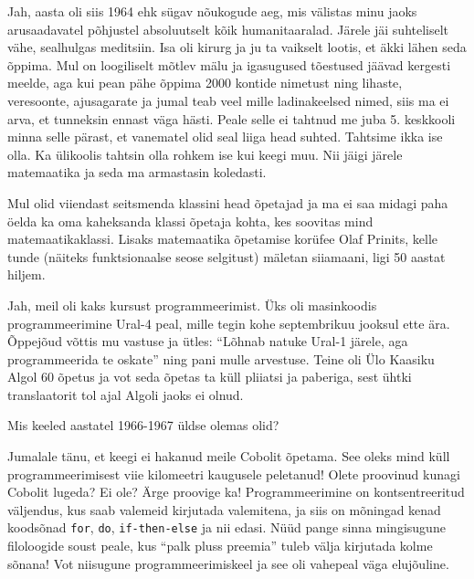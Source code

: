 
Jah, aasta oli siis 1964 ehk sügav nõukogude aeg, mis välistas minu jaoks arusaadavatel 
põhjustel absoluutselt kõik humanitaaralad. Järele jäi suhteliselt vähe, sealhulgas meditsiin. Isa oli kirurg ja ju ta 
vaikselt lootis, et äkki lähen seda õppima. Mul on loogiliselt mõtlev mälu ja 
igasugused tõestused jäävad kergesti meelde, aga kui pean 
pähe õppima 2000 kontide nimetust ning lihaste, veresoonte, 
ajusagarate ja jumal teab veel mille ladinakeelsed nimed, siis ma ei 
arva, et tunneksin ennast väga hästi. Peale selle ei tahtnud me juba 5. keskkooli 
minna selle pärast, et vanematel olid seal liiga head suhted. 
Tahtsime ikka ise olla. Ka ülikoolis tahtsin olla rohkem ise kui keegi muu. 
Nii jäigi järele matemaatika ja seda ma armastasin koledasti. 

Mul olid viiendast seitsmenda klassini head õpetajad ja ma ei saa midagi 
paha öelda ka oma kaheksanda klassi õpetaja kohta, kes soovitas mind matemaatikaklassi. Lisaks matemaatika õpetamise korüfee Olaf 
Prinits, kelle tunde (näiteks funktsionaalse seose selgitust) mäletan siiamaani, ligi 50 aastat hiljem. 


Jah, meil oli kaks kursust programmeerimist. Üks oli masinkoodis 
programmeerimine Ural-4 peal, mille tegin 
kohe septembrikuu jooksul ette ära. Õppejõud võttis mu 
vastuse ja ütles: \enquote{Lõhnab natuke Ural-1 järele, aga programmeerida te 
oskate} ning pani mulle arvestuse. Teine oli Ülo Kaasiku Algol 60 õpetus ja vot seda õpetas ta küll pliiatsi ja 
paberiga, sest ühtki translaatorit tol ajal Algoli jaoks ei olnud. 


Mis keeled aastatel 1966-1967 üldse olemas olid? 

Jumalale tänu, et keegi ei hakanud meile Cobolit õpetama. See 
oleks mind küll programmeerimisest viie kilomeetri kaugusele peletanud! Olete 
proovinud kunagi Cobolit lugeda? Ei ole? Ärge proovige ka! Programmeerimine 
on kontsentreeritud väljendus, kus saab valemeid kirjutada valemitena, ja 
siis on mõningad kenad koodsõnad \verb|for|, \verb|do|, 
\verb|if-then-else| ja nii edasi. Nüüd pange sinna mingisugune filoloogide 
soust peale, kus \enquote{palk pluss preemia} tuleb välja kirjutada kolme 
sõnana! Vot niisugune programmeerimiskeel ja see oli vahepeal väga elujõuline.


